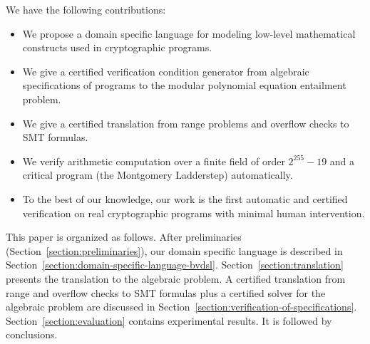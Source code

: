 We have the following contributions:
\begin{itemize}
\item We propose a domain specific language \bvdsl for modeling low-level
  mathematical constructs used in cryptographic programs.
\item We give a certified verification condition generator from
  algebraic specifications of programs to the modular polynomial
  equation entailment problem.
\item We give a certified translation from range problems and overflow checks to SMT formulas.
\item We verify arithmetic computation over a finite field of order
  $2^{255} - 19$ and a
  critical program (the Montgomery Ladderstep) automatically.
\item To the best of our knowledge, our work is the first automatic
  and certified verification on real cryptographic programs with
  minimal human intervention.
\end{itemize}




This paper is organized as follows. After preliminaries
(Section~\ref{section:preliminaries}), our domain specific
language is described in Section~\ref{section:domain-specific-language-bvdsl}.
Section~\ref{section:translation}
presents the translation to the algebraic
problem. A certified translation from range and overflow checks to SMT formulas plus a certified solver for the algebraic problem are discussed in Section~\ref{section:verification-of-specifications}.
Section~\ref{section:evaluation} contains experimental results. It is
followed by conclusions.

